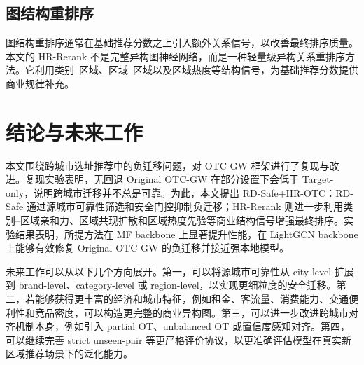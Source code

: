 \documentclass[10pt,twocolumn]{ctexart}
\begin{document}
\subsection{图结构重排序}

图结构重排序通常在基础推荐分数之上引入额外关系信号，以改善最终排序质量。本文的 HR-Rerank 不是完整异构图神经网络，而是一种轻量级异构关系重排序方法。它利用类别--区域、区域--区域以及区域热度等结构信号，为基础推荐分数提供商业规律补充。

\section{结论与未来工作}

本文围绕跨城市选址推荐中的负迁移问题，对 OTC-GW 框架进行了复现与改进。复现实验表明，无回退 Original OTC-GW 在部分设置下会低于 Target-only，说明跨城市迁移并不总是可靠。为此，本文提出 RD-Safe+HR-OTC：RD-Safe 通过源城市可靠性筛选和安全门控抑制负迁移；HR-Rerank 则进一步利用类别--区域亲和力、区域共现扩散和区域热度先验等商业结构信号增强最终排序。实验结果表明，所提方法在 MF backbone 上显著提升性能，在 LightGCN backbone 上能够有效修复 Original OTC-GW 的负迁移并接近强本地模型。

未来工作可以从以下几个方向展开。第一，可以将源城市可靠性从 city-level 扩展到 brand-level、category-level 或 region-level，以实现更细粒度的安全迁移。第二，若能够获得更丰富的经济和城市特征，例如租金、客流量、消费能力、交通便利性和竞品密度，可以构造更完整的商业异构图。第三，可以进一步改进跨城市对齐机制本身，例如引入 partial OT、unbalanced OT 或置信度感知对齐。第四，可以继续完善 strict unseen-pair 等更严格评价协议，以更准确评估模型在真实新区域推荐场景下的泛化能力。
\end{document}

